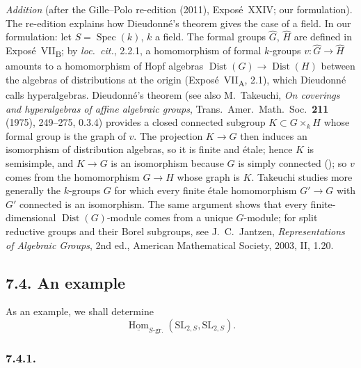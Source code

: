 \medskip\noindent
\emph{Addition} (after the Gille--Polo re-edition (2011), Exposé~XXIV; our formulation). The re-edition explains how Dieudonné's theorem gives the
case of a field. In our formulation: let \(S=\operatorname{Spec}(k)\), \(k\) a field. The formal groups
\(\widehat G\), \(\widehat H\) are defined in Exposé~VII\textsubscript{B}; by \emph{loc.\ cit.}, 2.2.1, a
homomorphism of formal \(k\)-groups \(v\colon\widehat G\to\widehat H\) amounts to a homomorphism of
Hopf algebras \(\operatorname{Dist}(G)\to\operatorname{Dist}(H)\) between the algebras of
distributions at the origin (Exposé~VII\textsubscript{A}, 2.1), which Dieudonné calls
hyperalgebras. Dieudonné's theorem (see also M.~Takeuchi, \emph{On coverings and hyperalgebras of
affine algebraic groups}, Trans.\ Amer.\ Math.\ Soc.\ \textbf{211} (1975), 249--275, 0.3.4) provides
a closed connected subgroup \(K\subset G\times_kH\) whose formal group is the graph of \(v\). The
projection \(K\to G\) then induces an isomorphism of distribution algebras, so it is finite and
étale; hence \(K\) is semisimple, and \(K\to G\) is an isomorphism because \(G\) is simply connected
\textup{()}; so \(v\) comes from the homomorphism \(G\to H\) whose
graph is \(K\). Takeuchi studies more generally the \(k\)-groups \(G\) for which every finite étale
homomorphism \(G'\to G\) with \(G'\) connected is an isomorphism. The same argument shows that every
finite-dimensional \(\operatorname{Dist}(G)\)-module comes from a unique \(G\)-module; for split
reductive groups and their Borel subgroups, see J.~C.~Jantzen, \emph{Representations of Algebraic
Groups}, 2nd ed., American Mathematical Society, 2003, II, 1.20.

\subsection*{7.4. An example}

As an example, we shall determine
\[
  \underline{\operatorname{Hom}}_{S\text{-}\mathrm{gr.}}
    (\mathrm{SL}_{2,S},\mathrm{SL}_{2,S}).
\]

\subsubsection*{7.4.1.}

